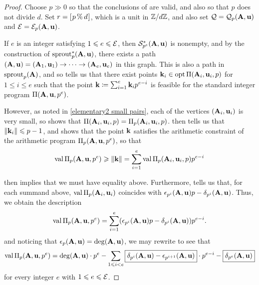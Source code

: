 \documentclass{article}
\begin{document}

\begin{proof}
   Choose $p \gg 0$ so that the conclusions of  are valid, and also so that $p$ does not divide $d$.  Set $r = [ \hspace{.01in} p \, \% \, d \hspace{.01in} ]$, which is a unit in $\mathbb{Z}/d\mathbb{Z}$, and also set $\mathcal{Q} = \mathcal{Q}_p(\mathbf{A},\mathbf{u})$ and $\mathcal{E} = \mathcal{E}_p(\mathbf{A}, \mathbf{u})$.  
   
   If $e$ is an integer satisfying $1 \leqslant e \leqslant \mathcal{E}$, then $\mathcal{S}_{p^e}^{\ast}(\mathbf{A},\mathbf{u})$ is nonempty, and by the construction of $\operatorname{sprout}_p^{\ast}(\mathbf{A},\mathbf{u})$, there exists a path $(\mathbf{A},\mathbf{u}) = (\mathbf{A}_1, \mathbf{u}_1) \to \cdots \to (\mathbf{A}_e, \mathbf{u}_e)$ in this graph.
   This is also a path in $\operatorname{sprout}_p(\mathbf{A})$, and so  tells us that there exist points $\mathbf{k}_i \in \operatorname{opt} \Pi(\mathbf{A}_i, \mathbf{u}_i, p)$ for $1 \le i \le e$ such that the point $\mathbf{k} \coloneqq \sum_{i=1}^e \mathbf{k}_i p^{e-i}$ is feasible for the standard integer program $\Pi(\mathbf{A}, \mathbf{u}, p^e)$.

   However, as noted in \eqref{elementary2 small pairs}, each of the vertices $(\mathbf{A}_i, \mathbf{u}_i)$ is very small, so  shows that $\Pi(\mathbf{A}_i,\mathbf{u}_i,p) = \Pi_p(\mathbf{A}_i, \mathbf{u}_i, p)$.
    then tells us that $\| \mathbf{k}_i \| \leqslant p - 1$, and  shows that the point $\mathbf{k}$ satisfies the arithmetic constraint of the arithmetic program $\Pi_p(\mathbf{A},\mathbf{u},p^e)$, so that
   \[
	\operatorname{val} \Pi_p(\mathbf{A},\mathbf{u},p^e) \geqslant  \| \mathbf{k} \| = \sum_{i=1}^e \operatorname{val} \Pi_p(\mathbf{A}_i,\mathbf{u}_i,p) p^{e-i}
	\]
   
    then implies that we must have equality above.  Furthermore,  tells us that, for each summand above,  $\operatorname{val} \Pi_p(\mathbf{A}_i, \mathbf{u}_i)$ coincides with $\epsilon_{p^i}(\mathbf{A},\mathbf{u})p - \delta_{p^i}(\mathbf{A},\mathbf{u})$.  Thus, we obtain the description
   \begin{equation}
   \label{value-for-e-at-most-curly-E: q}
     \operatorname{val} \Pi_p(\mathbf{A},\mathbf{u},p^e) = \sum_{i=1}^e (\epsilon_{p^i}(\mathbf{A},\mathbf{u})p - \delta_{p^i}(\mathbf{A},\mathbf{u})) p^{e-i}.
   \end{equation}
 and noticing that $\epsilon_p(\mathbf{A},\mathbf{u}) = \operatorname{deg}(\mathbf{A},\mathbf{u})$, we may rewrite to see that
\[
     \operatorname{val} \Pi_p(\mathbf{A},\mathbf{u},p^e) = \operatorname{deg}(\mathbf{A}, \mathbf{u}) \cdot p^e - \sum_{1 \leqslant i < e} \boxed{\delta_{p^i}(\mathbf{A}, \mathbf{u}) - \epsilon_{p^{i+1}}(\mathbf{A}, \mathbf{u})} \cdot p^{e-i} - \boxed{\delta_{p^e}(\mathbf{A}, \mathbf{u})}
\]
   for every integer $e$ with $1 \leqslant e \leqslant \mathcal{E}$.  
   

\end{proof}
\end{document}
